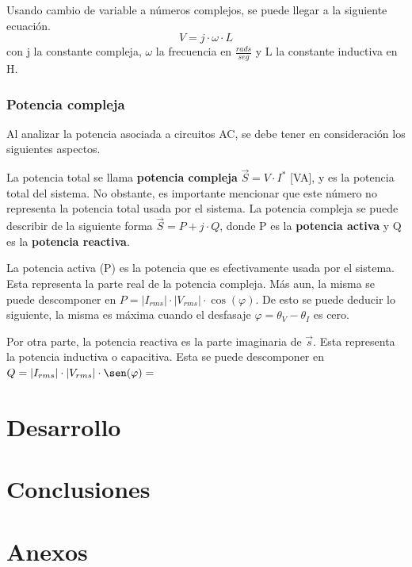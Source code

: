 \documentclass{article}
\begin{document}
        Usando cambio de variable a números complejos, se puede llegar a la siguiente ecuación.
        \begin{equation*}
            V=j\cdot \omega\cdot L
        \end{equation*}
        con j la constante compleja, $\omega$ la frecuencia en $\frac{rads}{seg}$ y L la constante inductiva en H.

        \subsubsection{Potencia compleja}

        Al analizar la potencia asociada a circuitos AC, se debe tener en consideración los siguientes aspectos.\par
        La potencia total se llama { \bfseries potencia compleja} $\vec{S}= V \cdot I^{*}$ [VA], y es la potencia total del sistema. No obstante, es importante mencionar que este número no representa la potencia total usada por el sistema.
        La potencia compleja se puede describir de la siguiente forma $\vec{S}=P + j \cdot Q$, donde P es la { \bfseries potencia activa} y Q es la {\bfseries potencia reactiva}. \par

        La potencia activa (P) es la potencia que es efectivamente usada por el sistema. Esta representa la parte real de la potencia compleja.
        Más aun, la misma se puede descomponer en $P= |I_{rms}| \cdot |V_{rms}| \cdot \cos (\varphi)$. De esto se puede deducir lo siguiente, la misma es máxima cuando el desfasaje $\varphi = \theta_{V} - \theta_I $ es cero. \par

        Por otra parte, la potencia reactiva es la parte imaginaria de $\vec{s}$. Esta representa la potencia inductiva o capacitiva. Esta se puede descomponer en $ Q = |I_{rms}| \cdot |V_{rms}| \cdot \sen (\varphi)= $
    \indent
    \section{Desarrollo}
   
    \section{Conclusiones}

    \section{Anexos}
\end{document}

